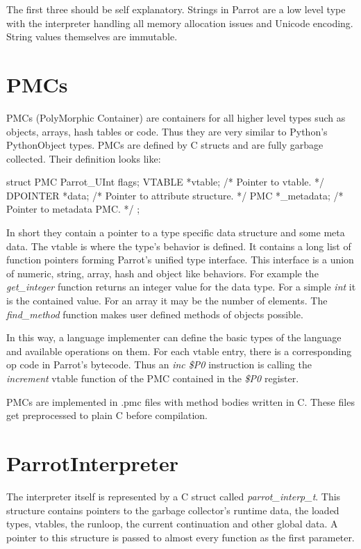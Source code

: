 \documentclass[bachelor,english]{hgbthesis}
\begin{document}
The first three should be self explanatory. Strings in Parrot are a low level type with the interpreter handling all memory allocation issues and Unicode encoding. String values themselves are immutable.

\section{PMCs}
\label{sec:PMCs}

PMCs (PolyMorphic Container) are containers for all higher level types such as objects, arrays, hash tables or code. Thus they are very similar to Python's PythonObject types. PMCs are defined by C structs and are fully garbage collected. Their definition looks like:
\begin{CCode}
struct PMC {
    Parrot_UInt    flags;
    VTABLE         *vtable;             /* Pointer to vtable. */
    DPOINTER       *data;               /* Pointer to attribute structure. */
    PMC            *_metadata;          /* Pointer to metadata PMC. */
};
\end{CCode}
In short they contain a pointer to a type specific data structure and some meta data. The vtable is where the type's behavior is defined. It contains a long list of function pointers forming Parrot's unified type interface. This interface is a union of numeric, string, array, hash and object like behaviors. For example the  \textit{get\_integer} function returns an integer value for the data type. For a simple \textit{int} it is the contained value. For an array it may be the number of elements. The \textit{find\_method} function makes user defined methods of objects possible.

In this way, a language implementer can define the basic types of the language and available operations on them. For each vtable entry, there is a corresponding op code in Parrot's bytecode. Thus an \textit{inc \$P0} instruction is calling the \textit{increment} vtable function of the PMC contained in the \textit{\$P0} register.

PMCs are implemented in .pmc files with method bodies written in C. These files get preprocessed to plain C before compilation.

\section{ParrotInterpreter}

The interpreter itself is represented by a C struct called \textit{parrot\_interp\_t}. This structure contains pointers to the garbage collector's runtime data, the loaded types, vtables, the runloop, the current continuation and other global data. A pointer to this structure is passed to almost every function as the first parameter.
\end{document}

